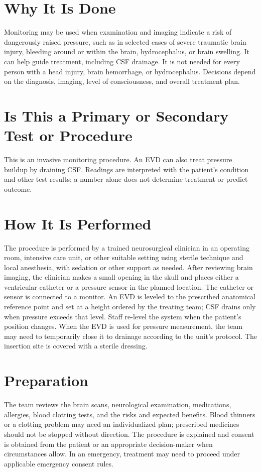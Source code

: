 \section*{Why It Is Done}
Monitoring may be used when examination and imaging indicate a risk of dangerously raised pressure, such as in selected cases of severe traumatic brain injury, bleeding around or within the brain, hydrocephalus, or brain swelling. It can help guide treatment, including CSF drainage. It is not needed for every person with a head injury, brain hemorrhage, or hydrocephalus. Decisions depend on the diagnosis, imaging, level of consciousness, and overall treatment plan.

\section*{Is This a Primary or Secondary Test or Procedure}
This is an invasive monitoring procedure. An EVD can also treat pressure buildup by draining CSF. Readings are interpreted with the patient's condition and other test results; a number alone does not determine treatment or predict outcome.

\section*{How It Is Performed}
The procedure is performed by a trained neurosurgical clinician in an operating room, intensive care unit, or other suitable setting using sterile technique and local anesthesia, with sedation or other support as needed. After reviewing brain imaging, the clinician makes a small opening in the skull and places either a ventricular catheter or a pressure sensor in the planned location. The catheter or sensor is connected to a monitor. An EVD is leveled to the prescribed anatomical reference point and set at a height ordered by the treating team; CSF drains only when pressure exceeds that level. Staff re-level the system when the patient's position changes. When the EVD is used for pressure measurement, the team may need to temporarily close it to drainage according to the unit's protocol. The insertion site is covered with a sterile dressing.

\section*{Preparation}
The team reviews the brain scans, neurological examination, medications, allergies, blood clotting tests, and the risks and expected benefits. Blood thinners or a clotting problem may need an individualized plan; prescribed medicines should not be stopped without direction. The procedure is explained and consent is obtained from the patient or an appropriate decision-maker when circumstances allow. In an emergency, treatment may need to proceed under applicable emergency consent rules.

